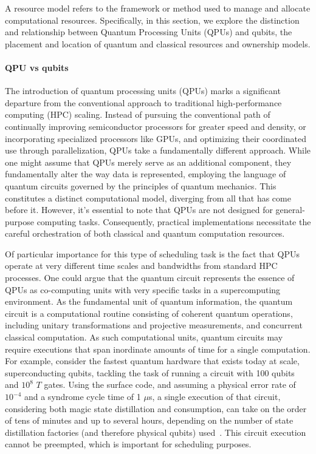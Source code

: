 A resource model refers to the framework or method used to manage and allocate computational resources. Specifically, in this section, we explore the distinction and relationship between Quantum Processing Units (QPUs) and qubits, the placement and location of quantum and classical resources and ownership models.


\paragraph{\textbf{QPU vs qubits}}

The introduction of quantum processing units (QPUs) marks a significant departure from the conventional approach to traditional high-performance computing (HPC) scaling. Instead of pursuing the conventional path of continually improving semiconductor processors for greater speed and density, or incorporating specialized processors like GPUs, and optimizing their coordinated use through parallelization, QPUs take a fundamentally different approach. While one might assume that QPUs merely serve as an additional component, they fundamentally alter the way data is represented, employing the language of quantum circuits governed by the principles of quantum mechanics. This constitutes a distinct computational model, diverging from all that has come before it. However, it's essential to note that QPUs are not designed for general-purpose computing tasks. Consequently, practical implementations necessitate the careful orchestration of both classical and quantum computation resources.

Of particular importance for this type of scheduling task is the fact that QPUs operate at very different time scales and bandwidths from standard HPC processes. One could argue that the quantum circuit represents the essence of QPUs as co-computing units with very specific tasks in a supercomputing environment. As the fundamental unit of quantum information, the quantum circuit is a computational routine consisting of coherent quantum operations, including unitary transformations and projective measurements, and concurrent classical computation. As such computational units, quantum circuits may require executions that span inordinate amounts of time for a single computation. For example, consider the fastest quantum hardware that exists today at scale, superconducting qubits, tackling the task of running a circuit with 100 qubits and $10^8$ $T$ gates. Using the surface code, and assuming a physical error rate of $10^{-4}$ and a syndrome cycle time of 1 $\mu$s, a single execution of that circuit, considering both magic state distillation and consumption, can take on the order of tens of minutes and up to several hours, depending on the number of state distillation factories (and therefore physical qubits) used~\cite{litinski2019game}. This circuit execution cannot be preempted, which is important for scheduling purposes. 


